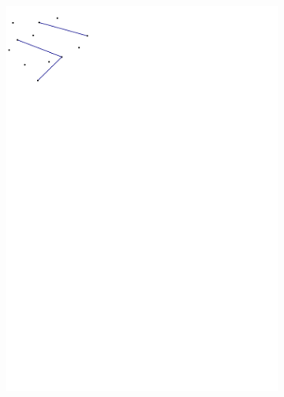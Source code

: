 \begin{enumerate}
\begin{figure}[h]
\begin{subfigure}[b]{0.4\linewidth}
    \includegraphics[width=\textwidth]{figs/cdt_exercise.pdf}
  \end{subfigure}%
  \hfill\vline\hfill
  \begin{subfigure}[b]{0.4\linewidth}

\end{subfigure}
\end{figure}
\end{enumerate}
